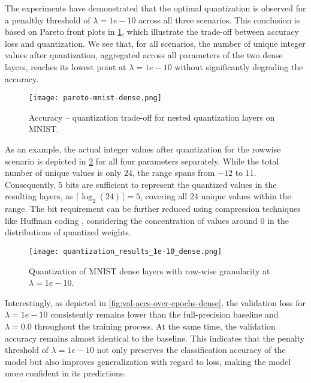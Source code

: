 The experiments have demonstrated that the optimal quantization is observed for a penalthy threshold of 
\( \lambda = 1e-10 \) across all three scenarios.
This conclusion is based on Pareto front plots in \cref{fig:pareto-mnist-dense},
which illustrate the trade-off between accuracy loss and quantization.
We see that, for all scenarios, 
the number of unique integer values after quantization, 
aggregated across all parameters of the two dense layers, reaches its lowest point at \( \lambda = 1e-10 \)
without significantly degrading the accuracy.


\begin{figure}[t!]
  \centering
  \texttt{[image: pareto-mnist-dense.png]}
  \caption{Accuracy – quantization trade-off for nested quantization layers on MNIST.}
  \label{fig:pareto-mnist-dense}
\end{figure}

As an example, the actual integer values after quantization for the rowwise scenario is 
depicted in \cref{fig:quantization_results_1e-10_dense} for all four parameters separately.
While the total number of unique values is only \( 24 \), the range spans from \( -12 \) to \( 11 \).
Consequently, \( 5 \) bits are sufficient to represent the quantized values in the resulting layers, 
as \( \lceil \log_2(24) \rceil = 5 \), covering all 24 unique values within the range. 
The bit requirement can be further reduced using compression techniques like Huffman coding \cite{4051119}, 
considering the concentration of values around 0 in the distributions of quantized weights.


\begin{figure}[b!]
  \centering
  \texttt{[image: quantization\_results\_1e-10\_dense.png]}
  \caption{Quantization of MNIST dense layers with row-wise granularity at \( \lambda  = 1e-10 \).}
  \label{fig:quantization_results_1e-10_dense}
\end{figure}


Interestingly, as depicted in \cref{fig:val-accs-over-epochs-dense}, 
the validation loss for \( \lambda = 1e-10 \) 
consistently remains lower than the full-precision baseline and \( \lambda = 0.0 \) throughout the training process.
At the same time, the validation accuracy
remains almost identical to the baseline. This indicates that the penalty threshold of
\( \lambda = 1e-10 \) 
not only preserves the classification accuracy of the model
but also improves generalization with regard to loss,
making the model more confident in its predictions.

